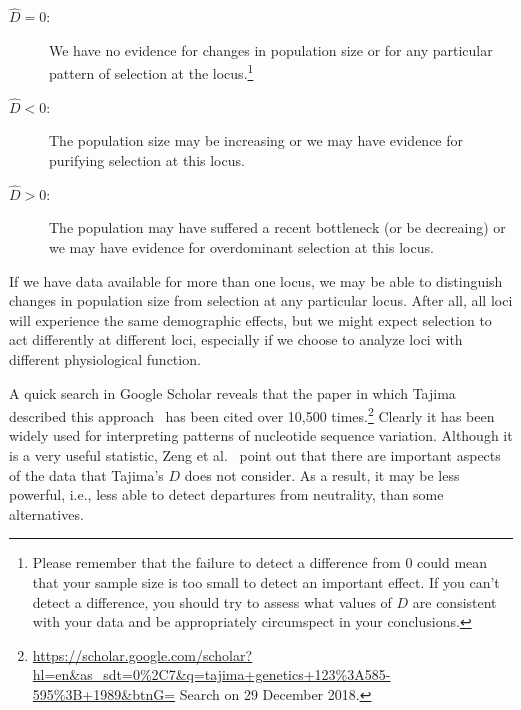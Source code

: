 \begin{description}

\item[$\hat D = 0$:] We have no evidence for changes in population
  size or for any particular pattern of selection at the
  locus.\footnote{Please remember that the failure to detect a difference
    from 0 could mean that your sample size is too small to detect an
    important effect. If you can't detect a difference, you should try
    to assess what values of $D$ are consistent with your data and be
    appropriately circumspect in your conclusions.}

\item[$\hat D < 0$:] The population size may be increasing or we may
  have evidence for purifying selection at this locus.

\item[$\hat D > 0$:] The population may have suffered a recent
  bottleneck (or be decreaing) or we may have evidence for
  overdominant selection at this locus.

\end{description}

\noindent If we have data available for more than one locus, we may be
able to distinguish changes in population size from selection at any
particular locus. After all, all loci will experience the same
demographic effects, but we might expect selection to act differently
at different loci, especially if we choose to analyze loci with
different physiological function.

A quick search in Google Scholar reveals that the paper in which
Tajima described this approach~\cite{Tajima89} has been cited over
10,500
times.\footnote{\url{https://scholar.google.com/scholar?hl=en&as_sdt=0\%2C7&q=tajima+genetics+123\%3A585-595\%3B+1989&btnG=}
  Search on 29 December 2018.} Clearly it has been widely used for
interpreting patterns of nucleotide sequence variation. Although it is
a very useful statistic, Zeng et al.~\cite{Zeng-etal-2006} point out
that there are important aspects of the data that Tajima's $D$ does
not consider. As a result, it may be less powerful, i.e., less able to
detect departures from neutrality, than some alternatives.

